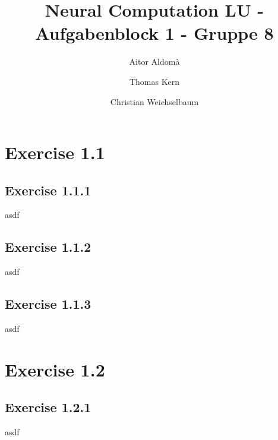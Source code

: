 \documentclass[journal]{IEEEtran}
\begin{document}
\title{Neural Computation LU - Aufgabenblock 1 - Gruppe 8}


\author{Aitor Aldomà \and Thomas Kern \and Christian Weichselbaum}
        
\maketitle

\section{Exercise 1.1}
\subsection{Exercise 1.1.1}
asdf
\subsection{Exercise 1.1.2}
asdf
\subsection{Exercise 1.1.3}
asdf
\section{Exercise 1.2}
\subsection{Exercise 1.2.1}
asdf
\end{document}
